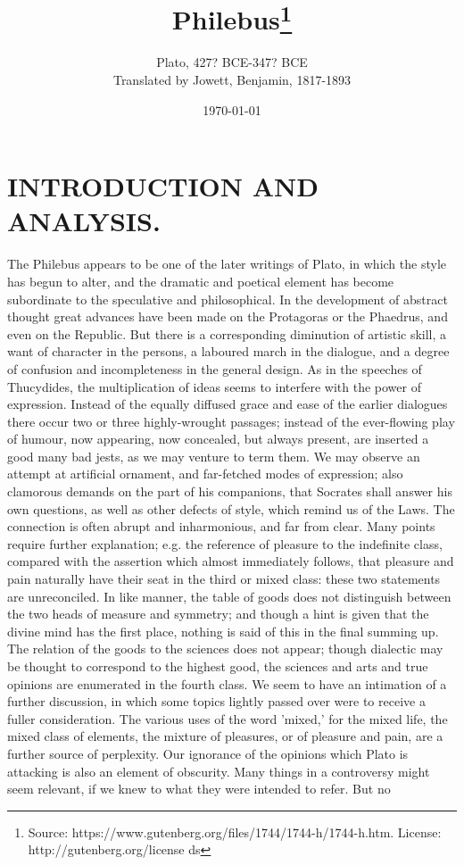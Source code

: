 \documentclass[11pt,letter]{article}
\begin{document}
\title{Philebus\thanks{Source: https://www.gutenberg.org/files/1744/1744-h/1744-h.htm. License: http://gutenberg.org/license ds}}
\date{\today}
\author{Plato, 427? BCE-347? BCE\\ Translated by Jowett, Benjamin, 1817-1893}
\maketitle

\setcounter{tocdepth}{1}
\tableofcontents
\renewcommand{\baselinestretch}{1.0}
\normalsize
\newpage

\section{
      INTRODUCTION AND ANALYSIS.
    }
\par  The Philebus appears to be one of the later writings of Plato, in which the style has begun to alter, and the dramatic and poetical element has become subordinate to the speculative and philosophical. In the development of abstract thought great advances have been made on the Protagoras or the Phaedrus, and even on the Republic. But there is a corresponding diminution of artistic skill, a want of character in the persons, a laboured march in the dialogue, and a degree of confusion and incompleteness in the general design. As in the speeches of Thucydides, the multiplication of ideas seems to interfere with the power of expression. Instead of the equally diffused grace and ease of the earlier dialogues there occur two or three highly-wrought passages; instead of the ever-flowing play of humour, now appearing, now concealed, but always present, are inserted a good many bad jests, as we may venture to term them. We may observe an attempt at artificial ornament, and far-fetched modes of expression; also clamorous demands on the part of his companions, that Socrates shall answer his own questions, as well as other defects of style, which remind us of the Laws. The connection is often abrupt and inharmonious, and far from clear. Many points require further explanation; e.g. the reference of pleasure to the indefinite class, compared with the assertion which almost immediately follows, that pleasure and pain naturally have their seat in the third or mixed class: these two statements are unreconciled. In like manner, the table of goods does not distinguish between the two heads of measure and symmetry; and though a hint is given that the divine mind has the first place, nothing is said of this in the final summing up. The relation of the goods to the sciences does not appear; though dialectic may be thought to correspond to the highest good, the sciences and arts and true opinions are enumerated in the fourth class. We seem to have an intimation of a further discussion, in which some topics lightly passed over were to receive a fuller consideration. The various uses of the word 'mixed,' for the mixed life, the mixed class of elements, the mixture of pleasures, or of pleasure and pain, are a further source of perplexity. Our ignorance of the opinions which Plato is attacking is also an element of obscurity. Many things in a controversy might seem relevant, if we knew to what they were intended to refer. But no 
\end{document}

